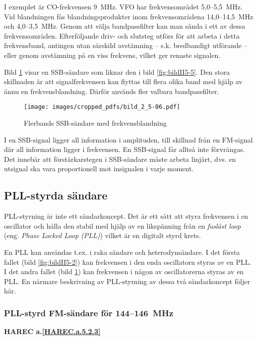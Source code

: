I exemplet är CO-frekvensen 9~MHz. VFO har frekvensområdet 5,0--5,5~MHz.
Vid blandningen fås blandningsprodukter inom frekvensområdena
14,0--14,5~MHz och 4,0--3,5~MHz.
Genom att välja bandpassfilter kan man sända i ett av dessa frekvensområden.
Efterföljande driv- och slutsteg utförs för att arbeta i detta frekvensband,
antingen utan särskild avstämning -- s.k. bredbandigt utförande -- eller genom
avstämning på en viss frekvens, vilket ger renaste signalen.

Bild \ref{fig:bildII5-6} visar en SSB-sändare som liknar den i
bild \ref{fig:bildII5-5}.
Den stora skillnaden är att signalfrekvensen kan flyttas till flera olika band
med hjälp av ännu en frekvensblandning.
Därför används fler valbara bandpassfilter.

\begin{figure}
  \texttt{[image: images/cropped\_pdfs/bild\_2\_5-06.pdf]}
  \caption{Flerbands SSB-sändare med frekvensblandning}
  \label{fig:bildII5-6}
\end{figure}

I en SSB-signal ligger all information i amplituden, till skillnad
från en FM-signal där all information ligger i frekvensen.
En SSB-signal får alltså inte förvrängas.
Det innebär att förstärkarstegen i SSB-sändare måste arbeta linjärt, dvs. en
utsignal ska vara proportionell mot insignalen i varje moment.

\subsection{PLL-styrda sändare}

PLL-styrning är inte ett sändarkoncept. Det är ett sätt att styra
frekvensen i en oscillator och hålla den stabil med hjälp av en
likspänning från en \emph{faslåst loop} (eng. \emph{Phase Locked Loop (PLL)})
vilket är en digitalt styrd krets.

En PLL kan användas t.ex. i raka sändare och heterodynsändare.
I det första fallet (bild \ref{fig:bildII5-2}) kan frekvensen i den enda
oscillatorn styras av en PLL.
I det andra fallet (bild \ref{fig:bildII5-6}) kan frekvensen i
någon av oscillatorerna styras av en PLL.
En närmare beskrivning av PLL-styrning av dessa två sändarkoncept följer här.

\subsubsection{PLL-styrd FM-sändare för 144--146~MHz}
\textbf{HAREC
  a.\ref{HAREC.a.5.2.3}\label{myHAREC.a.5.2.3}
}

